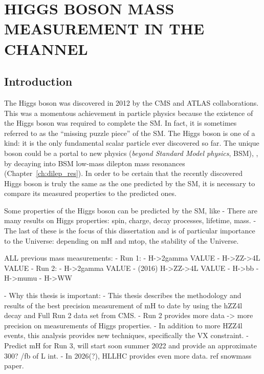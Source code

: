 \chapter{HIGGS BOSON MASS MEASUREMENT IN THE \texorpdfstring{\hzzfourl}{H to ZZ to 4l} CHANNEL}
\section{Introduction}
The Higgs boson was discovered in 2012 by the CMS and ATLAS collaborations.
This was a momentous achievement in particle physics because the existence of the Higgs boson was required to complete the SM.
In fact, it is sometimes referred to as the ``missing puzzle piece'' of the SM.
The Higgs boson is one of a kind: it is the only fundamental scalar particle ever discovered so far.
The unique boson could be a portal to new physics (\emph{beyond Standard Model physics}, BSM), \eg, by decaying into BSM low-mass dilepton mass resonances (Chapter~\ref{ch:dilep_res}).
In order to be certain that the recently discovered Higgs boson is truly the same as the one predicted by the SM, it is necessary to compare its measured properties to the predicted ones.

Some properties of the Higgs boson can be predicted by the SM, like 
    - There are many results on Higgs properties: spin, charge, decay processes, lifetime, mass.
    - The last of these is the focus of this dissertation and is of particular importance to the Universe: depending on mH and mtop, the stability of the Universe.

ALL previous mass measurements:
    - Run 1:
        - H->2gamma VALUE
        - H->ZZ->4L VALUE
    - Run 2:
        - H->2gamma VALUE
        - (2016) H->ZZ->4L VALUE
        - H->bb
        - H->mumu
        - H->WW 

- Why this thesis is important:
    - This thesis describes the methodology and results of the best precision measurement of mH to date by using the hZZ4l decay and Full Run 2 data set from CMS.
    - Run 2 provides more data -> more precision on measurements of Higgs properties.
    - In addition to more HZZ4l events, this analysis provides new techniques, specifically the VX constraint.
    - Predict mH for Run 3, will start soon summer 2022 and provide an approximate 300? /fb of L int.
    - In 2026(?), HLLHC provides even more data. ref snowmass paper.

